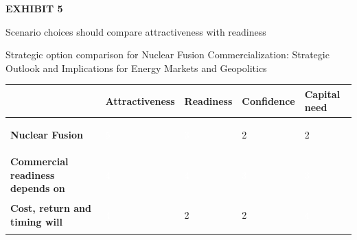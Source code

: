 \documentclass[10pt,a4paper]{article}
\begin{document}
\clearpage
{\textcolor{BOGreen}{\scriptsize\bfseries EXHIBIT 5}}\par\vspace{4pt}
{\sffamily\fontsize{17}{21}\selectfont\color{BONavy} Scenario choices should compare attractiveness with readiness}\par
{\small\color{BOText} Strategic option comparison for Nuclear Fusion Commercialization: Strategic Outlook and Implications for Energy Markets and Geopolitics}\par\vspace{6pt}
{\scriptsize\begin{tabular}{p{38mm}>{\centering\arraybackslash}p{21mm}>{\centering\arraybackslash}p{21mm}>{\centering\arraybackslash}p{21mm}>{\centering\arraybackslash}p{21mm}}
 & {\bfseries Attractiveness} & {\bfseries Readiness} & {\bfseries Confidence} & {\bfseries Capital need} \\
\hline
{\bfseries Nuclear Fusion} & \colorbox{BOGreen}{\textcolor{white}{\strut\hspace{5pt}5\hspace{5pt}}} & \colorbox{BOBlue}{\textcolor{white}{\strut\hspace{5pt}3\hspace{5pt}}} & \colorbox{BOLight}{\textcolor{BOText}{\strut\hspace{5pt}2\hspace{5pt}}} & \colorbox{BOLight}{\textcolor{BOText}{\strut\hspace{5pt}2\hspace{5pt}}} \\
{\bfseries Commercial readiness depends on} & \colorbox{BOGreen}{\textcolor{white}{\strut\hspace{5pt}4\hspace{5pt}}} & \colorbox{BOGreen}{\textcolor{white}{\strut\hspace{5pt}4\hspace{5pt}}} & \colorbox{BOBlue}{\textcolor{white}{\strut\hspace{5pt}3\hspace{5pt}}} & \colorbox{BOBlue}{\textcolor{white}{\strut\hspace{5pt}3\hspace{5pt}}} \\
{\bfseries Cost, return and timing will} & \colorbox{BOGreen}{\textcolor{white}{\strut\hspace{5pt}4\hspace{5pt}}} & \colorbox{BOLight}{\textcolor{BOText}{\strut\hspace{5pt}2\hspace{5pt}}} & \colorbox{BOLight}{\textcolor{BOText}{\strut\hspace{5pt}2\hspace{5pt}}} & \colorbox{BOGreen}{\textcolor{white}{\strut\hspace{5pt}4\hspace{5pt}}} \\

\end{tabular}}
\end{document}
